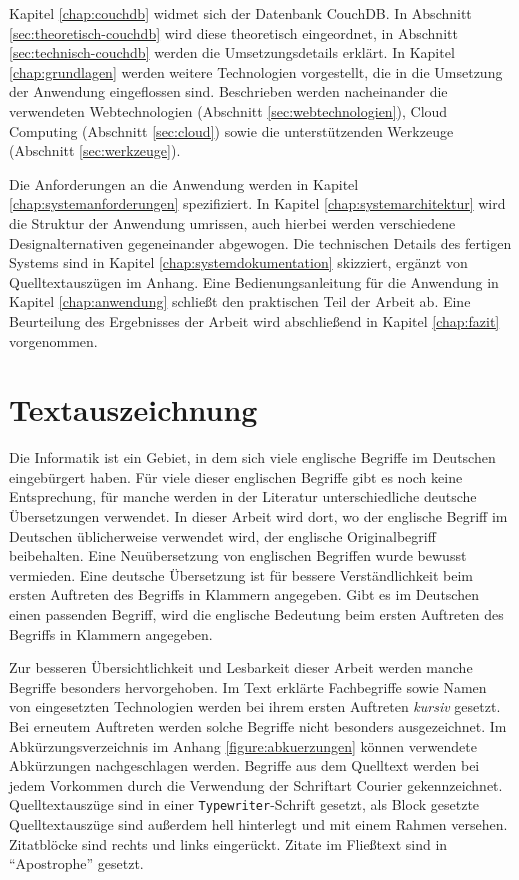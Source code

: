 Kapitel \ref{chap:couchdb} widmet sich der Datenbank CouchDB. In Abschnitt \ref{sec:theoretisch-couchdb} wird diese theoretisch eingeordnet, in Abschnitt \ref{sec:technisch-couchdb} werden die Umsetzungsdetails erklärt. In Kapitel \ref{chap:grundlagen} werden weitere Technologien vorgestellt, die in die Umsetzung der Anwendung eingeflossen sind. Beschrieben werden nacheinander die verwendeten Webtechnologien (Abschnitt \ref{sec:webtechnologien}), Cloud Computing (Abschnitt \ref{sec:cloud}) sowie die unterstützenden Werkzeuge (Abschnitt \ref{sec:werkzeuge}).

Die Anforderungen an die Anwendung werden in Kapitel \ref{chap:systemanforderungen} spezifiziert. In Kapitel \ref{chap:systemarchitektur} wird die Struktur der Anwendung umrissen, auch hierbei werden verschiedene Designalternativen gegeneinander abgewogen. Die technischen Details des fertigen Systems sind in Kapitel \ref{chap:systemdokumentation} skizziert, ergänzt von Quelltextauszügen im Anhang. Eine Bedienungsanleitung für die Anwendung in Kapitel \ref{chap:anwendung} schließt den praktischen Teil der Arbeit ab. Eine Beurteilung des Ergebnisses der Arbeit wird abschließend in Kapitel \ref{chap:fazit} vorgenommen.

\section{Textauszeichnung}


Die Informatik ist ein Gebiet, in dem sich viele englische Begriffe im Deutschen eingebürgert haben. Für viele dieser englischen Begriffe gibt es noch keine Entsprechung, für manche werden in der Literatur unterschiedliche deutsche Übersetzungen verwendet. In dieser Arbeit wird dort, wo der englische Begriff im Deutschen üblicherweise verwendet wird, der englische Originalbegriff beibehalten. Eine Neuübersetzung von englischen Begriffen wurde bewusst vermieden. Eine deutsche Übersetzung ist für bessere Verständlichkeit beim ersten Auftreten des Begriffs in Klammern angegeben. Gibt es im Deutschen einen passenden Begriff, wird die englische Bedeutung beim ersten Auftreten des Begriffs in Klammern angegeben.

Zur besseren Übersichtlichkeit und Lesbarkeit dieser Arbeit werden manche Begriffe besonders hervorgehoben. Im Text erklärte Fachbegriffe sowie Namen von eingesetzten Technologien werden bei ihrem ersten Auftreten \textit{kursiv} gesetzt. Bei erneutem Auftreten werden solche Begriffe nicht besonders ausgezeichnet. Im Abkürzungsverzeichnis im Anhang \ref{figure:abkuerzungen} können verwendete Abkürzungen nachgeschlagen werden. Begriffe aus dem Quelltext werden bei jedem Vorkommen durch die Verwendung der Schriftart {\selectfont Courier} gekennzeichnet. Quelltextauszüge sind in einer \lstinline!Typewriter!-Schrift gesetzt, als Block gesetzte Quelltextauszüge sind außerdem hell hinterlegt und mit einem Rahmen versehen. Zitatblöcke sind rechts und links eingerückt. Zitate im Fließtext sind in \enquote{Apostrophe} gesetzt.


